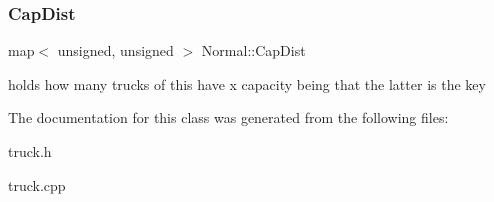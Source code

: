 \subsubsection{\texorpdfstring{Cap\+Dist}{CapDist}}
{\footnotesize\ttfamily map$<$ unsigned, unsigned $>$ Normal\+::\+Cap\+Dist\hspace{0.3cm}{\ttfamily [static]}}

holds how many trucks of this have x capacity being that the latter is the key 

The documentation for this class was generated from the following files\+:\begin{DoxyCompactItemize}
\item 
truck.\+h\item 
truck.\+cpp\end{DoxyCompactItemize}
